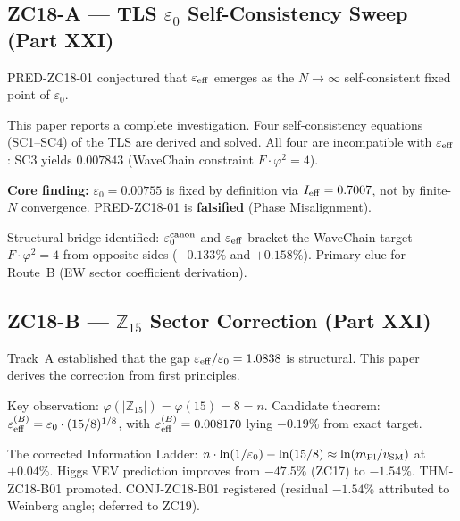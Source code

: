 \documentclass[11pt, a4paper]{article}
\newcommand{\Ztf}{\mathbb{Z}_{15}}
\begin{document}
\subsection{ZC18-A --- TLS $\varepsilon_0$ Self-Consistency Sweep (Part XXI)}

\begin{zcbox}[title={ZC18 Track A: PRED-ZC18-01 Falsified}]
\sloppy
PRED-ZC18-01 conjectured that $\varepsilon_{\rm eff}$ emerges as the
$N\to\infty$ self-consistent fixed point of $\varepsilon_0$.

This paper reports a complete investigation. Four self-consistency
equations (SC1--SC4) of the TLS are derived and solved.
All four are incompatible with $\varepsilon_{\rm eff}$:
SC3 yields $0.007843$ (WaveChain constraint $F\cdot\varphi^2=4$).

\textbf{Core finding:} $\varepsilon_0 = 0.00755$ is fixed by definition
via $I_{\rm eff} = 0.7007$, not by finite-$N$ convergence.
PRED-ZC18-01 is \textbf{falsified} (Phase Misalignment).

Structural bridge identified: $\varepsilon_0^{\rm canon}$ and $\varepsilon_{\rm eff}$
bracket the WaveChain target $F\cdot\varphi^2=4$ from opposite sides ($-0.133\%$ and $+0.158\%$).
Primary clue for Route~B (EW sector coefficient derivation).
\end{zcbox}

\subsection{ZC18-B --- $\mathbb{Z}_{15}$ Sector Correction (Part XXI)}

\begin{zcbox}[title={ZC18 Track B: THM-ZC18-B01}]
\sloppy
Track~A established that the gap $\varepsilon_{\rm eff}/\varepsilon_0 = 1.0838$
is structural. This paper derives the correction from first principles.

Key observation: $\varphi(|\Ztf|) = \varphi(15) = 8 = n$.
Candidate theorem: $\varepsilon_{\rm eff}^{(B)} = \varepsilon_0\cdot(15/8)^{1/8}$,
with $\varepsilon_{\rm eff}^{(B)} = 0.008170$ lying $-0.19\%$ from exact target.

The corrected Information Ladder:
$n\cdot\ln(1/\varepsilon_0) - \ln(15/8) \approx \ln(m_{\rm Pl}/v_{\rm SM})$
at $+0.04\%$. Higgs VEV prediction improves from $-47.5\%$ (ZC17) to $-1.54\%$.
THM-ZC18-B01 promoted. CONJ-ZC18-B01 registered (residual $-1.54\%$ attributed
to Weinberg angle; deferred to ZC19).
\end{zcbox}
\end{document}
